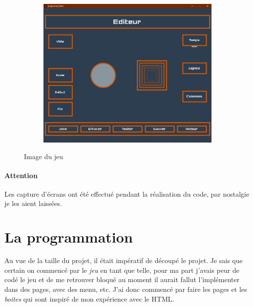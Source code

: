 \documentclass[10pt,a4paper]{article}
\begin{document}
\begin{figure}[h!]
\begin{subfigure}{.24\textwidth}
\end{subfigure} 
\begin{subfigure}{.24\textwidth}
	\centering
	\includegraphics[width=.9\linewidth]{Capture4.PNG}
\end{subfigure}
\label{fig10}
\caption{Image du jeu}
\end{figure}
\paragraph{Attention}Les capture d'écrans ont été effectué pendant la réalisation du code, par nostalgie je les aient laissées. 
\section{La programmation}
Au vue de la taille du projet, il était impératif de découpé le projet. Je sais que certain on commencé par le \textit{jeu} en tant que telle, pour ma part j'avais peur de codé le jeu et de me retrouver bloqué au moment il aurait fallut l'implémenter dans des pages, avec des menu, etc. J'ai donc commencé par faire les pages et les \textit{boites} qui sont inspiré de mon expérience avec le HTML. 
\end{document}
